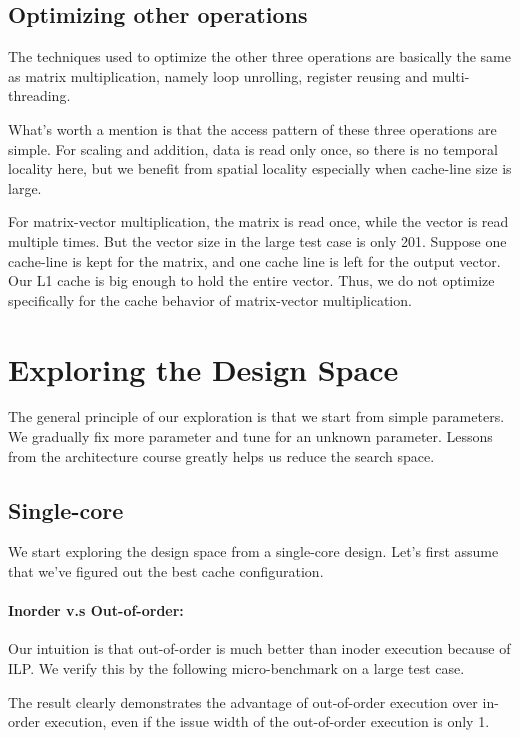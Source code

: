 \documentclass[twocolumn,letterpaper,10pt]{article}
\begin{document}
\subsection{Optimizing other operations}
The techniques used to optimize the other three operations are
basically the same as matrix multiplication, namely loop unrolling,
register reusing and multi-threading.

What's worth a mention is that the access pattern of these three
operations are simple. For
scaling and addition, data is read only once, so there is no
temporal locality here, but we benefit from spatial locality
especially when cache-line size is large.

For matrix-vector multiplication, the matrix is read once, while the
vector is read multiple times. But the vector size in the large test
case is only 201. Suppose one cache-line is kept for the matrix, and one cache line
is left for the output vector. Our L1 cache is big enough to hold the
entire vector. Thus, we do not optimize specifically for the cache
behavior of matrix-vector multiplication.


\section{Exploring the Design Space}
\label{sec:design}

The general principle of our exploration is that we start from simple
parameters. We gradually fix more parameter and tune for an unknown
parameter. Lessons from the architecture course greatly helps us reduce the search space.

\subsection{Single-core}
We start exploring the design space from a single-core design. Let's
first assume that we've figured out the best cache configuration.

\paragraph{Inorder v.s Out-of-order:} Our intuition is that
out-of-order is much better than inoder execution because of ILP. We
verify this by the following micro-benchmark on a large test case.

The result clearly demonstrates the advantage of out-of-order
execution over in-order execution, even if the issue width of the
out-of-order execution is only 1.
\end{document}
